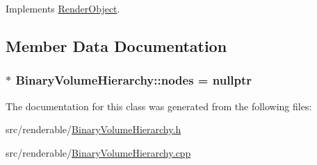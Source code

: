 Implements \hyperlink{classRenderObject_aa844ad2c5ef0c2b79faef2ed0af553bb}{Render\+Object}.



\subsection{Member Data Documentation}
\subsubsection[{\texorpdfstring{nodes}{nodes}}]{$\ast$ Binary\+Volume\+Hierarchy\+::nodes = nullptr\hspace{0.3cm}{\ttfamily [private]}}\hypertarget{classBinaryVolumeHierarchy_abbadac5cecbdedd8df30cd294ff0ed29}{}\label{classBinaryVolumeHierarchy_abbadac5cecbdedd8df30cd294ff0ed29}


The documentation for this class was generated from the following files\+:\begin{DoxyCompactItemize}
\item 
src/renderable/\hyperlink{BinaryVolumeHierarchy_8h}{Binary\+Volume\+Hierarchy.\+h}\item 
src/renderable/\hyperlink{BinaryVolumeHierarchy_8cpp}{Binary\+Volume\+Hierarchy.\+cpp}\end{DoxyCompactItemize}

